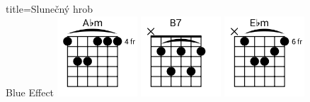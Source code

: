 \begin{song}{title=\predtitle \centering Slunečný hrob \\\large Blue Effect  \vspace*{-0.0cm}}
\centering
\includegraphics[width=3cm]{../Akordy/asmi.png}
\includegraphics[width=3cm]{../Akordy/h7.png}
\includegraphics[width=3cm]{../Akordy/esmi.png}



\setcounter{Slokočet}{0}
\end{song}


